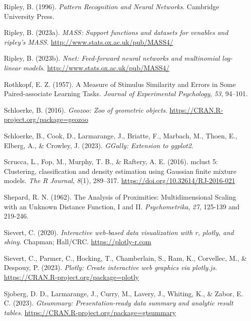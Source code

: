 \documentclass[
  letterpaper,
]{krantz}
\newlength{\cslhangindent}
\newlength{\cslentryspacingunit} %
\newenvironment{CSLReferences}[2] %
 {%
  \setlength{\parindent}{0pt}
  \ifodd #1
  \let\oldpar\par
  \def\par{\hangindent=\cslhangindent\oldpar}
  \fi
  \setlength{\parskip}{#2\cslentryspacingunit}
 }%
 {}
\begin{document}
\begin{CSLReferences}{1}{0}
\leavevmode{}%
Ripley, B. (1996). \emph{Pattern {R}ecognition and {N}eural {N}etworks}.
Cambridge University Press.

\leavevmode{}%
Ripley, B. (2023a). \emph{MASS: Support functions and datasets for
venables and ripley's MASS}. \url{http://www.stats.ox.ac.uk/pub/MASS4/}

\leavevmode{}%
Ripley, B. (2023b). \emph{Nnet: Feed-forward neural networks and
multinomial log-linear models}.
\url{http://www.stats.ox.ac.uk/pub/MASS4/}

\leavevmode{}%
Rothkopf, E. Z. (1957). A {M}easure of {S}timulus {S}imilarity and
{E}rrors in {S}ome {P}aired-associate {L}earning {T}asks. \emph{Journal
of Experimental Psychology}, \emph{53}, 94--101.

\leavevmode{}%
Schloerke, B. (2016). \emph{Geozoo: Zoo of geometric objects}.
\url{https://CRAN.R-project.org/package=geozoo}

\leavevmode{}%
Schloerke, B., Cook, D., Larmarange, J., Briatte, F., Marbach, M.,
Thoen, E., Elberg, A., \& Crowley, J. (2023). \emph{GGally: Extension to
ggplot2}.

\leavevmode{}%
Scrucca, L., Fop, M., Murphy, T. B., \& Raftery, A. E. (2016). {mclust}
5: Clustering, classification and density estimation using {G}aussian
finite mixture models. \emph{The {R} Journal}, \emph{8}(1), 289--317.
\url{https://doi.org/10.32614/RJ-2016-021}

\leavevmode{}%
Shepard, R. N. (1962). The {A}nalysis of {P}roximities:
{M}ultidimensional {S}caling with an {U}nknown {D}istance {F}unction,
{I} and {II}. \emph{Psychometrika}, \emph{27}, 125-139 and 219-246.

\leavevmode{}%
Sievert, C. (2020). \emph{Interactive web-based data visualization with
r, plotly, and shiny}. Chapman; Hall/CRC. \url{https://plotly-r.com}

\leavevmode{}%
Sievert, C., Parmer, C., Hocking, T., Chamberlain, S., Ram, K.,
Corvellec, M., \& Despouy, P. (2023). \emph{Plotly: Create interactive
web graphics via plotly.js}.
\url{https://CRAN.R-project.org/package=plotly}

\leavevmode{}%
Sjoberg, D. D., Larmarange, J., Curry, M., Lavery, J., Whiting, K., \&
Zabor, E. C. (2023). \emph{Gtsummary: Presentation-ready data summary
and analytic result tables}.
\url{https://CRAN.R-project.org/package=gtsummary}


\end{CSLReferences}
\end{document}
